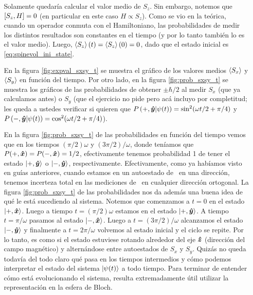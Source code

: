 \documentclass[10pt, a4paper]{article}
\newcommand{\wt}{\omega t}
\numberwithin{equation}{subsection}
\begin{document}
Solamente quedaría calcular el valor medio de $S_z$. Sin embargo, notemos que
$\comm{S_z}{H} = 0$ (en particular en este caso $H \propto S_z$). Como se vio
en la teórica, cuando un operador conmuta con el Hamiltoniano, las
probabilidades de medir los distintos resultados son constantes en el tiempo (y
por lo tanto también lo es el valor medio). Luego, $\expval{S_z}(t) =
\expval{S_z}(0) = 0$, dado que el estado inicial es
\eqref{eq:spinevol_ini_state}.

En la figura \ref{fig:expval_sxsy_t} se muestra el gráfico de los valores
medios $\expval{S_x}$ y $\expval{S_y}$ en función del tiempo. Por otro lado, en
la figura \ref{fig:prob_sxsy_t} se muestra los gráficos de las probabilidades
de obtener $\pm\hbar/2$ al medir $S_x$ (que ya calculamos antes) o $S_y$ (que
el ejercicio no pide pero acá incluyo por completitud; les queda a ustedes
verificar si quieren que $\ProbRes{+,\vers{y}}{\psi(t)} = \sin^2(\wt/2 +
\pi/4)$ y $\ProbRes{-,\vers{y}}{\psi(t)} = \cos^2(\wt/2 + \pi/4)$).

\bigbreak

En la figura \ref{fig:prob_sxsy_t} de las probabilidades en función del tiempo
vemos que en los tiempos $(\pi/2)\omega$ y $(3\pi/2)/\omega$, donde teníamos
que $P(+,\vu*{x}) = P(-,\vu*{x}) = 1/2$, efectivamente tenemos probabilidad 1
de tener el estado $\ket{+,\vu*{y}}$ o $\ket{-,\vu*{y}}$, respectivamente.
Efectivamente, como ya habíamos visto en guías anteriores, cuando estamos en un
autoestado de \spin\ en una dirección, tenemos incerteza total en las
mediciones de \spin\ en cualquier dirección ortogonal. La figura
\ref{fig:prob_sxsy_t} de las probabilidades nos da además una buena idea de qué
le está sucediendo al sistema. Notemos que comenzamos a $t = 0$ en el estado
$\ket{+,\vu*{x}}$. Luego a tiempo $t = (\pi/2)\omega$ estamos en el estado
$\ket{+,\vu*{y}}$. A tiempo $t = \pi/\omega$ pasamos al estado
$\ket{-,\vu*{x}}$. Luego a $t = (3\pi/2)/\omega$ alcanzamos el estado
$\ket{-,\vu*{y}}$ y finalmente a $t = 2\pi/\omega$ volvemos al estado inicial
y el ciclo se repite. Por lo tanto, es como si el estado estuviese rotando
alrededor del eje $\vu*{z}$ (dirección del campo magnético) y alternándose
entre autoestados de $S_x$ y $S_y$. Quizás no queda todavía del todo claro qué
pasa en los tiempos intermedios y cómo podemos interpretar el estado del
sistema $\ket{\psi(t)}$ a todo tiempo. Para terminar de entender cómo está
evolucionando el sistema, resulta extremadamente útil utilizar la
representación en la esfera de Bloch.
\end{document}
